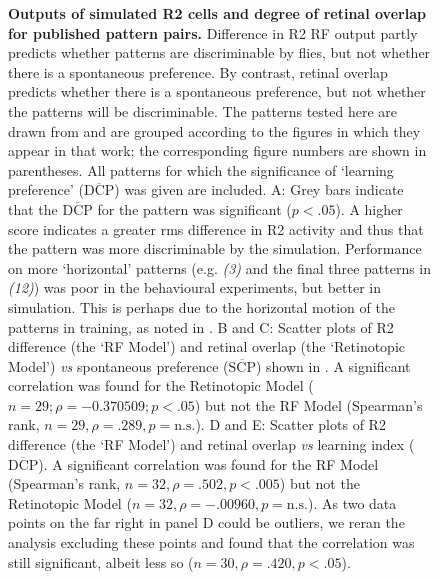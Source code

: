 \begin{figure}[htp]
	\caption{
		{\bf Outputs of simulated R2 cells and degree of retinal overlap for published pattern pairs.}
		Difference in R2 \ac{RF} output partly predicts whether patterns are discriminable by flies, but not whether there is a spontaneous preference.
		By contrast, retinal overlap predicts whether there is a spontaneous preference, but not whether the patterns will be discriminable.
		The patterns tested here are drawn from \protect\cite{Ernst1999} and are grouped according to the figures in which they appear in that work; the corresponding figure numbers are shown in parentheses.
		All patterns for which the significance of `learning preference' ($\overline{\mathrm{DCP}}$) was given are included.
		A: Grey bars indicate that the $\overline{\mathrm{DCP}}$ for the pattern was significant ($p<.05$).
		A higher score indicates a greater \ac{rms} difference in R2 activity and thus that the pattern was more discriminable by the simulation.
		Performance on more `horizontal' patterns (e.g. \emph{(3)} and the final three patterns in \emph{(12)}) was poor in the behavioural experiments, but better in simulation.
		This is perhaps due to the horizontal motion of the patterns in training, as noted in \protect\cite{Ernst1999}.
		B and C: Scatter plots of R2 difference (the `\ac{RF} Model') and retinal overlap (the `Retinotopic Model') \emph{vs} spontaneous preference ($\overline{\mathrm{SCP}}$) shown in \protect\cite{Ernst1999}.
		A significant correlation was found for the Retinotopic Model ($n = 29; \rho = -0.370509; p < .05$) but not the \ac{RF} Model (Spearman's rank, $n=29, \rho=.289, p=\mathrm{n.s.}$).
		D and E: Scatter plots of R2 difference (the `\ac{RF} Model') and retinal overlap \emph{vs} learning index ($\overline{\mathrm{DCP}}$).
		A significant correlation was found for the \ac{RF} Model (Spearman's rank, $n=32, \rho=.502, p < .005$) but not the Retinotopic Model ($n=32, \rho=-.00960, p=\mathrm{n.s.}$).
		As two data points on the far right in panel D could be outliers, we reran the analysis excluding these points and found that the correlation was still significant, albeit less so ($n=30, \rho=.420, p < .05$).
	}
	\label{fig:pattern}
\end{figure}

